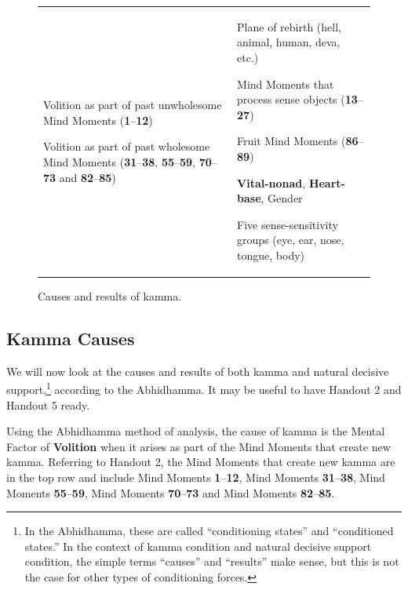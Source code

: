 \begin{figure}[H]

\begin{tabular*}{\textwidth}{L{\tabcolsep} | L{\tabcolsep}}
\toprule
{} &  \\
\midrule

Volition as part of past unwholesome Mind Moments (\textbf{1}--\textbf{12})

\vspace{2mm}

Volition as part of past wholesome Mind Moments (\textbf{31}--\textbf{38}, \textbf{55}--\textbf{59}, \textbf{70}--\textbf{73} and \textbf{82}--\textbf{85})
&
Plane of rebirth (hell, animal, human, deva, etc.)

\vspace{2mm}

Mind Moments that process sense objects (\textbf{13}--\textbf{27})

\vspace{2mm}

Fruit Mind Moments (\textbf{86}--\textbf{89})

\vspace{2mm}

\textbf{Vital-nonad}, \textbf{Heart-base}, Gender
\vspace{2mm}

Five sense-sensitivity groups (eye, ear, nose, tongue, body)
 \\
 
\bottomrule
\end{tabular*}
\caption{Causes and results of kamma.}
\label{fig:Kamma}
\end{figure}

\subsection*{Kamma Causes}

We will now look at the causes and results of both kamma and natural decisive support,\footnote{In the Abhidhamma, these are called “conditioning states” and “conditioned states.” In the context of kamma condition and natural decisive support condition, the simple terms “causes” and “results” make sense, but this is not the case for other types of conditioning forces.} according to the Abhidhamma. It may be useful to have Handout 2 and Handout 5 ready.

Using the Abhidhamma method of analysis, the cause of kamma is the Mental Factor of \textbf{Volition} when it arises as part of the Mind Moments that create new kamma. Referring to Handout 2, the Mind Moments that create new kamma are in the top row and include Mind Moments \textbf{1}--\textbf{12}, Mind Moments \textbf{31}--\textbf{38}, Mind Moments \textbf{55}--\textbf{59}, Mind Moments \textbf{70}--\textbf{73} and Mind Moments \textbf{82}--\textbf{85}.

